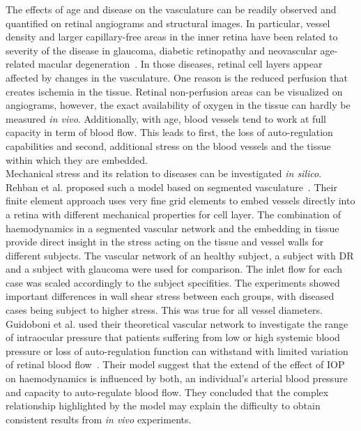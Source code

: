 \documentclass[12pt,a4paper]{journal}
\begin{document}
The effects of age and disease on the vasculature can be readily observed and quantified on retinal angiograms and structural images.
In particular, vessel density and larger capillary-free areas in the inner retina have been related to severity of the disease in glaucoma, diabetic retinopathy and neovascular age-related macular degeneration~\cite{Al_Sheikh_2016, Rao_2020, Yuan_2020}.
In those diseases, retinal cell layers appear affected by changes in the vasculature.
One reason is the reduced perfusion that creates ischemia in the tissue.
Retinal non-perfusion areas can be visualized on angiograms, however, the exact availability of oxygen in the tissue can hardly be measured \textit{in vivo}.
Additionally, with age, blood vessels tend to work at full capacity in term of blood flow.
This leads to first, the loss of auto-regulation capabilities and second, additional stress on the blood vessels and the tissue within which they are embedded.\\
Mechanical stress and its relation to diseases can be investigated \textit{in silico}.
Rehban et al. proposed such a model based on segmented vasculature~\cite{Rebhan_2019}.
Their finite element approach uses very fine grid elements to embed vessels directly into a retina with different mechanical properties for cell layer.
The combination of haemodynamics in a segmented vascular network and the embedding in tissue provide direct insight in the stress acting on the tissue and vessel walls for different subjects.
The vascular network of an healthy subject, a subject with DR and a subject with glaucoma were used for comparison.
The inlet flow for each case was scaled accordingly to the subject specifities.
The experiments showed important differences in wall shear stress between each groups, with diseased cases being subject to higher stress.
This was true for all vessel diameters.\\
Guidoboni et al. used their theoretical vascular network to investigate the range of intraocular pressure that patients suffering from low or high systemic blood pressure or loss of auto-regulation function can withstand with limited variation of retinal blood flow~\cite{Guidoboni_2014b}.
Their model suggest that the extend of the effect of IOP on haemodynamics is influenced by both, an individual's arterial blood pressure and capacity to auto-regulate blood flow.
They concluded that the complex relationship highlighted by the model may explain the difficulty to obtain consistent results from \textit{in vivo} experiments.
\end{document}

